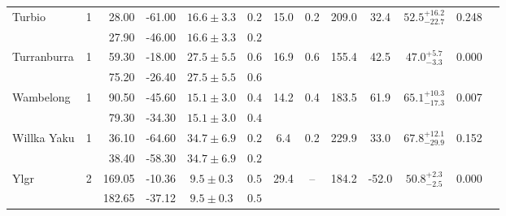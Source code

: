 \begin{tabular}{lcrrccccccccr}
	\multirow{2}{*}{Turbio} & \multirow{2}{*}{1} & 28.00 & -61.00 & $16.6 \pm 3.3$ & $0.2$ & \multirow{2}{*}{15.0} & \multirow{2}{*}{0.2} & \multirow{2}{*}{209.0} & \multirow{2}{*}{32.4} & \multirow{2}{*}{$52.5^{+16.2}_{-22.7}$} & \multirow{2}{*}{0.248} & \multirow{2}{*}{\citet{Shipp:2018}} \\
	 &  & 27.90 & -46.00 & $16.6 \pm 3.3$ & $0.2$ &  &  &  &  &  &  &  \\
	\multirow{2}{*}{Turranburra} & \multirow{2}{*}{1} & 59.30 & -18.00 & $27.5 \pm 5.5$ & $0.6$ & \multirow{2}{*}{16.9} & \multirow{2}{*}{0.6} & \multirow{2}{*}{155.4} & \multirow{2}{*}{42.5} & \multirow{2}{*}{$47.0^{+5.7}_{-3.3}$} & \multirow{2}{*}{0.000} & \multirow{2}{*}{\citet{Shipp:2018}} \\
	 &  & 75.20 & -26.40 & $27.5 \pm 5.5$ & $0.6$ &  &  &  &  &  &  &  \\
	\multirow{2}{*}{Wambelong} & \multirow{2}{*}{1} & 90.50 & -45.60 & $15.1 \pm 3.0$ & $0.4$ & \multirow{2}{*}{14.2} & \multirow{2}{*}{0.4} & \multirow{2}{*}{183.5} & \multirow{2}{*}{61.9} & \multirow{2}{*}{$65.1^{+10.3}_{-17.3}$} & \multirow{2}{*}{0.007} & \multirow{2}{*}{\citet{Shipp:2018}} \\
	 &  & 79.30 & -34.30 & $15.1 \pm 3.0$ & $0.4$ &  &  &  &  &  &  &  \\
	\multirow{2}{*}{Willka Yaku} & \multirow{2}{*}{1} & 36.10 & -64.60 & $34.7 \pm 6.9$ & $0.2$ & \multirow{2}{*}{6.4} & \multirow{2}{*}{0.2} & \multirow{2}{*}{229.9} & \multirow{2}{*}{33.0} & \multirow{2}{*}{$67.8^{+12.1}_{-29.9}$} & \multirow{2}{*}{0.152} & \multirow{2}{*}{\citet{Shipp:2018}} \\
	 &  & 38.40 & -58.30 & $34.7 \pm 6.9$ & $0.2$ &  &  &  &  &  &  &  \\
	\multirow{2}{*}{Ylgr} & \multirow{2}{*}{2} & 169.05 & -10.36 & $9.5 \pm 0.3$ & $0.5$ & \multirow{2}{*}{29.4} & \multirow{2}{*}{--} & \multirow{2}{*}{184.2} & \multirow{2}{*}{-52.0} & \multirow{2}{*}{$50.8^{+2.3}_{-2.5}$} & \multirow{2}{*}{0.000} & \multirow{2}{*}{\citet{Ibata:2019}} \\
	 &  & 182.65 & -37.12 & $9.5 \pm 0.3$ & $0.5$ &  &  &  &  &  &  &  \\
	\bottomrule
\end{tabular}
